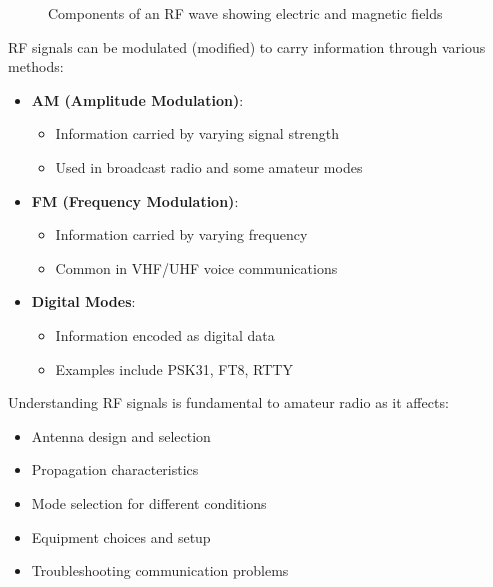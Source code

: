 \begin{figure}[h]
    \centering
    \caption{Components of an RF wave showing electric and magnetic fields}
    \label{fig:rf_wave}
\end{figure}

RF signals can be modulated (modified) to carry information through various methods:
\begin{itemize}
    \item \textbf{AM (Amplitude Modulation)}:
        \begin{itemize}
            \item Information carried by varying signal strength
            \item Used in broadcast radio and some amateur modes
        \end{itemize}
    
    \item \textbf{FM (Frequency Modulation)}:
        \begin{itemize}
            \item Information carried by varying frequency
            \item Common in VHF/UHF voice communications
        \end{itemize}
    
    \item \textbf{Digital Modes}:
        \begin{itemize}
            \item Information encoded as digital data
            \item Examples include PSK31, FT8, RTTY
        \end{itemize}
\end{itemize}

Understanding RF signals is fundamental to amateur radio as it affects:
\begin{itemize}
    \item Antenna design and selection
    \item Propagation characteristics
    \item Mode selection for different conditions
    \item Equipment choices and setup
    \item Troubleshooting communication problems
\end{itemize}


